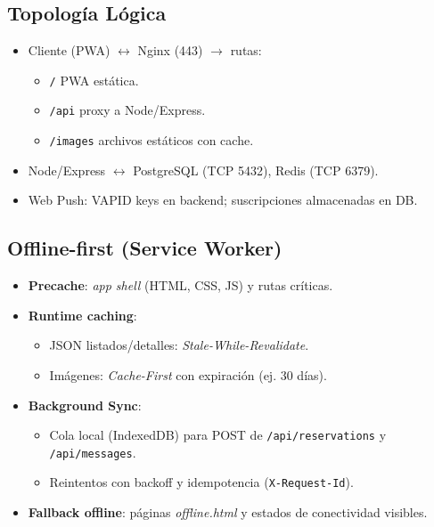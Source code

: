 \documentclass[12pt]{article}
\begin{document}
\subsection{Topología Lógica}
\begin{itemize}[left=0pt, itemsep=4pt]
  \item Cliente (PWA) $\leftrightarrow$ Nginx (443) $\to$ rutas:
    \begin{itemize}[nosep]
      \item \texttt{/} PWA estática.
      \item \texttt{/api} proxy a Node/Express.
      \item \texttt{/images} archivos estáticos con cache.
    \end{itemize}
  \item Node/Express $\leftrightarrow$ PostgreSQL (TCP 5432), Redis (TCP 6379).
  \item Web Push: VAPID keys en backend; suscripciones almacenadas en DB.
\end{itemize}

\subsection{Offline-first (Service Worker)}
\begin{itemize}[left=0pt, itemsep=4pt]
  \item \textbf{Precache}: \textit{app shell} (HTML, CSS, JS) y rutas críticas.
  \item \textbf{Runtime caching}:
    \begin{itemize}[nosep]
      \item JSON listados/detalles: \emph{Stale-While-Revalidate}.
      \item Imágenes: \emph{Cache-First} con expiración (ej. 30 días).
    \end{itemize}
  \item \textbf{Background Sync}:
    \begin{itemize}[nosep]
      \item Cola local (IndexedDB) para POST de \texttt{/api/reservations} y \texttt{/api/messages}.
      \item Reintentos con backoff y idempotencia (\texttt{X-Request-Id}).
    \end{itemize}
  \item \textbf{Fallback offline}: páginas \emph{offline.html} y estados de conectividad visibles.
\end{itemize}
\end{document}
